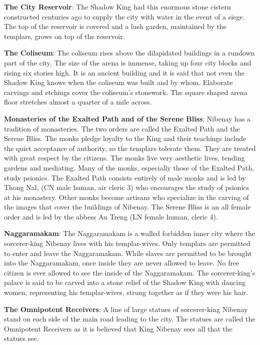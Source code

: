 {
	\textbf{The City Reservoir}: The Shadow King had this enormous stone cistern constructed centuries ago to supply the city with water in the event of a siege. The top of the reservoir is covered and a lush garden, maintained by the templars, grows on top of the reservoir.

	\textbf{The Coliseum}: The coliseum rises above the dilapidated buildings in a rundown part of the city. The size of the arena is immense, taking up four city blocks and rising six stories high. It is an ancient building and it is said that not even the Shadow King knows when the coliseum was built and by whom. Elaborate carvings and etchings cover the coliseum's stonework. The square shaped arena floor stretches almost a quarter of a mile across.

	\textbf{Monasteries of the Exalted Path and of the Serene Bliss}: Nibenay has a tradition of monasteries. The two orders are called the Exalted Path and the Serene Bliss. The monks pledge loyalty to the King and their teachings include the quiet acceptance of authority, so the templars tolerate them. They are treated with great respect by the citizens. The monks live very aesthetic lives, tending gardens and mediating. Many of the monks, especially those of the Exalted Path, study psionics. The Exalted Path consists entirely of male monks and is led by Thong Nal, (CN male human, air cleric 3) who encourages the study of psionics at his monastery. Other monks become artisans who specialize in the carving of the images that cover the buildings of Nibenay. The Serene Bliss is an all female order and is led by the abbess Au Treng (LN female human, cleric 4).

	\textbf{Naggaramakam}: The Naggaramakam is a walled forbidden inner city where the sorcerer-king Nibenay lives with his templar-wives. Only templars are permitted to enter and leave the Naggaramakam. While slaves are permitted to be brought into the Naggaramakam, once inside they are never allowed to leave. No free citizen is ever allowed to see the inside of the Naggaramakam. The sorcerer-king's palace is said to be carved into a stone relief of the Shadow King with dancing women, representing his templar-wives, strung together as if they were his hair.

	\textbf{The Omnipotent Receivers}: A line of large statues of sorcerer-king Nibenay stand on each side of the main road leading to the city. The statues are called the Omnipotent Receivers as it is believed that King Nibenay sees all that the statues see.

}
